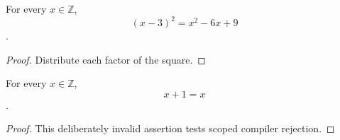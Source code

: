 \documentclass{article}
\begin{document}
\begin{theorem}\label{independent-identity}
For every $x\in\mathbb{Z}$, \[(x-3)^2=x^2-6x+9\].
\end{theorem}
\begin{proof}Distribute each factor of the square.\end{proof}
\begin{theorem}\label{deliberately-invalid}
For every $x\in\mathbb{Z}$, \[x+1=x\].
\end{theorem}
\begin{proof}This deliberately invalid assertion tests scoped compiler rejection.\end{proof}
\end{document}
